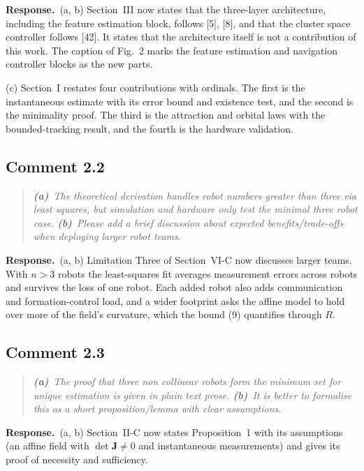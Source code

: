 \documentclass[10pt]{article}
\newcommand{\resp}{\par\textbf{Response.}~}
\begin{document}
\resp (a, b) Section~III now states that the three-layer architecture, including the feature estimation block, follows [5], [8], and that the cluster space controller follows [42]. It states that the architecture itself is not a contribution of this work. The caption of Fig.~2 marks the feature estimation and navigation controller blocks as the new parts.

(c) Section~I restates four contributions with ordinals. The first is the instantaneous estimate with its error bound and existence test, and the second is the minimality proof. The third is the attraction and orbital laws with the bounded-tracking result, and the fourth is the hardware validation.

\subsection*{Comment 2.2}

\begin{quote}\itshape
\textbf{(a)}~The theoretical derivation handles robot numbers greater than three via least squares, but simulation and hardware only test the minimal three robot case.
\textbf{(b)}~Please add a brief discussion about expected benefits/trade-offs when deploying larger robot teams.
\end{quote}


\resp (a, b) Limitation Three of Section~VI-C now discusses larger teams. With $n > 3$ robots the least-squares fit averages measurement errors across robots and survives the loss of one robot. Each added robot also adds communication and formation-control load, and a wider footprint asks the affine model to hold over more of the field's curvature, which the bound (9) quantifies through $R$.

\subsection*{Comment 2.3}

\begin{quote}\itshape
\textbf{(a)}~The proof that three non collinear robots form the minimum set for unique estimation is given in plain text prose.
\textbf{(b)}~It is better to formalise this as a short proposition/lemma with clear assumptions.
\end{quote}


\resp (a, b) Section~II-C now states Proposition~1 with its assumptions (an affine field with $\det\mathbf{J} \neq 0$ and instantaneous measurements) and gives its proof of necessity and sufficiency.
\end{document}
